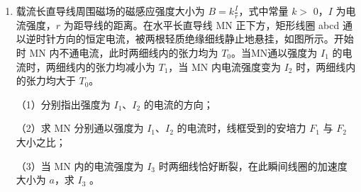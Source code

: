\documentclass[\gkver]{gaokaozhenti}
\begin{document}
\begin{enumerate}
{由于 $p+\rho gh=83.6\UcmHg$ 大于 $p_{0}$，因此必有水银从管中漏出。

设当管转至竖直位置时，管内水银柱长度为 $x$，由玻意耳定律得

$p_{0}SL_{0}=(p_{0}-\rho gx)S(L-x)$

整理并代入数据后得 $75\times50=(75-x)(100-x)$

解得：$x=25\Ucm$

设插入槽内后管内气柱长为 $L'$，由题设条件得 $L'=L-(x+\Delta h)=60\Ucm$

由玻意耳定律，插入后管内压强 $p=\frac{{{p_0}{L_0}}}{{L'}}=\frac{{75\times50}}{{60}}\UcmHg=62.5\UcmHg$

（2）设管内外水银面高度差为 $h'$

$h'=75-62.5=12.5\Ucm$

管口距槽内水银面距离

$H=L-L'-h'=(40-12.5)\Ucm=27.5\Ucm$
}

\item
载流长直导线周围磁场的磁感应强度大小为 $B = k\frac{I}{r}$，式中常量 $k >$ 0，$I$ 为电流强度，$r$ 为距导线的距离。在水平长直导线 MN 正下方，矩形线圈 abcd 通以逆时针方向的恒定电流，被两根轻质绝缘细线静止地悬挂，如图所示。开始时 MN 内不通电流，此时两细线内的张力均为 $T_{0}$。当MN通以强度为 $I_{1}$ 的电流时，两细线内的张力均减小为 $T_{1}$，当 MN 内电流强度变为 $I_{2}$ 时，两细线内的张力均大于 $T_{0}$。

（1）分别指出强度为 $I_{1}$、$I_{2}$ 的电流的方向；

（2）求 MN 分别通以强度为 $I_{1}$、$I_{2}$ 的电流时，线框受到的安培力 $F_{1}$ 与 $F_{2}$ 大小之比；

（3）当 MN 内的电流强度为 $I_{3}$ 时两细线恰好断裂，在此瞬间线圈的加速度大小为 $a$，求 $I_{3}$ 。
\onepicture[align=right, w=4.30cm]{}
\end{enumerate}
\end{document}
